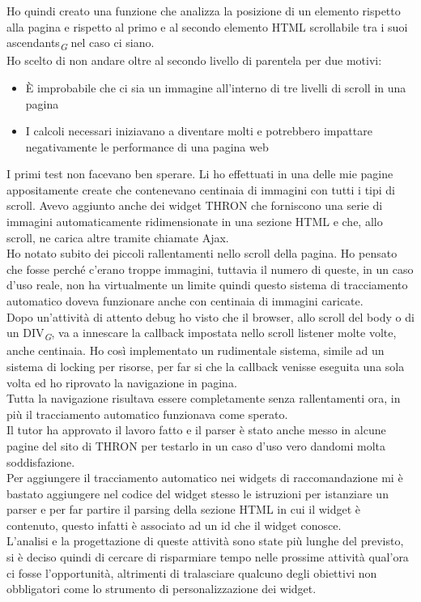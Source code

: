 \documentclass[a4paper, 12pt, twoside, openright]{book}
\newcommand{\gloss}[1]{#1\textsubscript{\textit{\tiny{G}}}}
\begin{document}
Ho quindi creato una funzione che analizza la posizione di un elemento rispetto alla pagina e rispetto al primo e al secondo elemento HTML scrollabile tra i suoi \gloss{ascendants} nel caso ci siano.\\
Ho scelto di non andare oltre al secondo livello di parentela per due motivi:
\begin{itemize}
	\item \`{E} improbabile che ci sia un immagine all'interno di tre livelli di scroll in una pagina
	\item I calcoli necessari iniziavano a diventare molti e potrebbero impattare negativamente le performance di una pagina web
\end{itemize} 
I primi test non facevano ben sperare. Li ho effettuati in una delle mie pagine appositamente create che contenevano centinaia di immagini con tutti i tipi di scroll. Avevo aggiunto anche dei widget THRON che forniscono una serie di immagini automaticamente ridimensionate in una sezione HTML e che, allo scroll, ne carica altre tramite chiamate Ajax.\\
Ho notato subito dei piccoli rallentamenti nello scroll della pagina. Ho pensato che fosse perché c'erano troppe immagini, tuttavia il numero di queste, in un caso d'uso reale, non ha virtualmente un limite quindi questo sistema di tracciamento automatico doveva funzionare anche con centinaia di immagini caricate.\\
Dopo un'attività di attento debug ho visto che il browser, allo scroll del body o di un \gloss{DIV}, va a innescare la callback impostata nello scroll listener molte volte, anche centinaia. Ho così implementato un rudimentale sistema, simile ad un sistema di locking per risorse, per far si che la callback venisse eseguita una sola volta ed ho riprovato la navigazione in pagina.\\
Tutta la navigazione  risultava essere completamente senza rallentamenti ora, in più il tracciamento automatico funzionava come sperato.\\
Il tutor ha approvato il lavoro fatto e il parser è stato anche messo in alcune pagine del sito di THRON per testarlo in un caso d'uso vero dandomi molta soddisfazione.\\
Per aggiungere il tracciamento automatico nei widgets di raccomandazione mi è bastato aggiungere nel codice del widget stesso le istruzioni per istanziare un parser e per far partire il parsing della sezione HTML in cui il widget è contenuto, questo infatti è associato ad un id che il widget conosce.\\
L'analisi e la progettazione di queste attività sono state più lunghe del previsto, si è deciso quindi di cercare di risparmiare tempo nelle prossime attività qual'ora ci fosse l'opportunità, altrimenti di tralasciare qualcuno degli obiettivi non obbligatori come lo strumento di personalizzazione dei widget.
\end{document}
